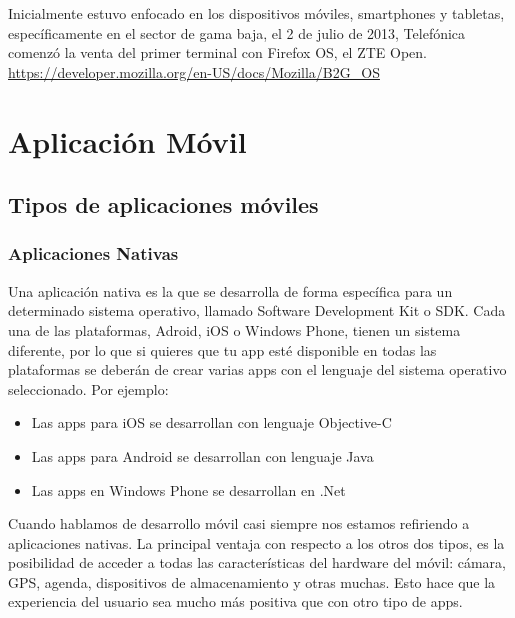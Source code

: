 Inicialmente estuvo enfocado en los dispositivos móviles, smartphones y tabletas, específicamente en el sector de gama baja, el 2 de julio de 2013, Telefónica comenzó la venta del primer terminal con Firefox OS, el ZTE Open.
\setlength{\parskip}{0mm}
\url{https://developer.mozilla.org/en-US/docs/Mozilla/B2G_OS}




\section{Aplicación Móvil}	

\subsection{Tipos de aplicaciones móviles}

\subsubsection{Aplicaciones Nativas}
\setlength{\parskip}{5mm}
Una aplicación nativa es la que se desarrolla de forma específica para un determinado  sistema operativo, llamado Software Development Kit o SDK. Cada una de las plataformas, Adroid, iOS o Windows Phone, tienen un sistema diferente, por lo que si quieres que tu app esté disponible en todas las plataformas se deberán de crear varias apps con el lenguaje del sistema operativo seleccionado.
Por ejemplo:
\setlength{\parskip}{0mm}
\begin{itemize}

	\item Las apps para iOS se desarrollan con lenguaje Objective-C
	
	\item Las apps para Android se desarrollan con lenguaje Java
	
	\item Las apps en Windows Phone se desarrollan en .Net

	
\end{itemize}
\setlength{\parskip}{5mm}
Cuando hablamos de desarrollo móvil casi siempre nos estamos refiriendo a aplicaciones nativas. La principal ventaja con respecto a los otros dos tipos, es la posibilidad de acceder a todas las características del hardware del móvil: cámara, GPS, agenda, dispositivos de almacenamiento y otras muchas. Esto hace que la experiencia del usuario sea mucho más positiva que con otro tipo de apps.

